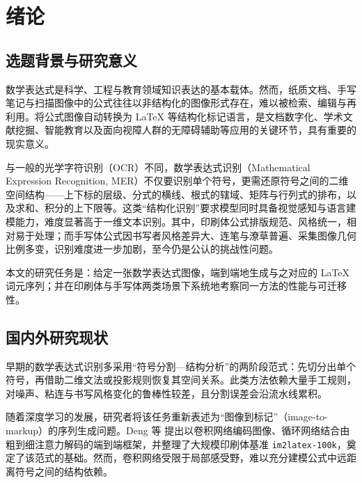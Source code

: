 \section{绪论}

\subsection{选题背景与研究意义}

数学表达式是科学、工程与教育领域知识表达的基本载体。然而，纸质文档、手写笔记与扫描图像中的公式往往以非结构化的图像形式存在，难以被检索、编辑与再利用。将公式图像自动转换为 LaTeX 等结构化标记语言，是文档数字化、学术文献挖掘、智能教育以及面向视障人群的无障碍辅助等应用的关键环节，具有重要的现实意义。

与一般的光学字符识别（OCR）不同，数学表达式识别（Mathematical Expression Recognition, MER）不仅要识别单个符号，更需还原符号之间的二维空间结构——上下标的层级、分式的横线、根式的辖域、矩阵与行列式的排布，以及求和、积分的上下限等。这类“结构化识别”要求模型同时具备视觉感知与语言建模能力，难度显著高于一维文本识别。其中，印刷体公式排版规范、风格统一，相对易于处理；而手写体公式因书写者风格差异大、连笔与潦草普遍、采集图像几何比例多变，识别难度进一步加剧，至今仍是公认的挑战性问题。

本文的研究任务是：给定一张数学表达式图像，端到端地生成与之对应的 LaTeX 词元序列；并在印刷体与手写体两类场景下系统地考察同一方法的性能与可迁移性。

\subsection{国内外研究现状}

早期的数学表达式识别多采用“符号分割—结构分析”的两阶段范式：先切分出单个符号，再借助二维文法或投影规则恢复其空间关系。此类方法依赖大量手工规则，对噪声、粘连与书写风格变化的鲁棒性较差，且分割误差会沿流水线累积。

随着深度学习的发展，研究者将该任务重新表述为“图像到标记”（image-to-markup）的序列生成问题。Deng 等\supercite{dengImagetomarkupGenerationCoarsetofine2017} 提出以卷积网络编码图像、循环网络结合由粗到细注意力解码的端到端框架，并整理了大规模印刷体基准 \texttt{im2latex-100k}\supercite{kanervisto_2016_56198}，奠定了该范式的基础。然而，卷积网络受限于局部感受野，难以充分建模公式中远距离符号之间的结构依赖。

